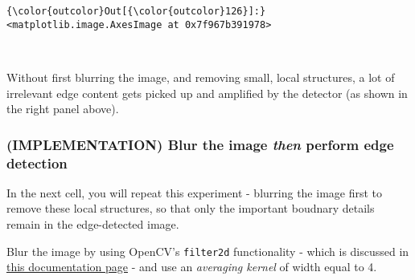 \documentclass[11pt]{article}
\begin{document}
\begin{Verbatim}[commandchars=\\\{\}]
{\color{outcolor}Out[{\color{outcolor}126}]:} <matplotlib.image.AxesImage at 0x7f967b391978>
\end{Verbatim}
            
    \begin{center}
    \end{center}
    { \hspace*{\fill} \\}
    
    Without first blurring the image, and removing small, local structures,
a lot of irrelevant edge content gets picked up and amplified by the
detector (as shown in the right panel above).

    \hypertarget{implementation-blur-the-image-then-perform-edge-detection}{%
\subsubsection{\texorpdfstring{(IMPLEMENTATION) Blur the image
\emph{then} perform edge
detection}{(IMPLEMENTATION) Blur the image then perform edge detection}}\label{implementation-blur-the-image-then-perform-edge-detection}}

In the next cell, you will repeat this experiment - blurring the image
first to remove these local structures, so that only the important
boudnary details remain in the edge-detected image.

Blur the image by using OpenCV's \texttt{filter2d} functionality - which
is discussed in
\href{http://docs.opencv.org/3.1.0/d4/d13/tutorial_py_filtering.html}{this
documentation page} - and use an \emph{averaging kernel} of width equal
to 4.
\end{document}
